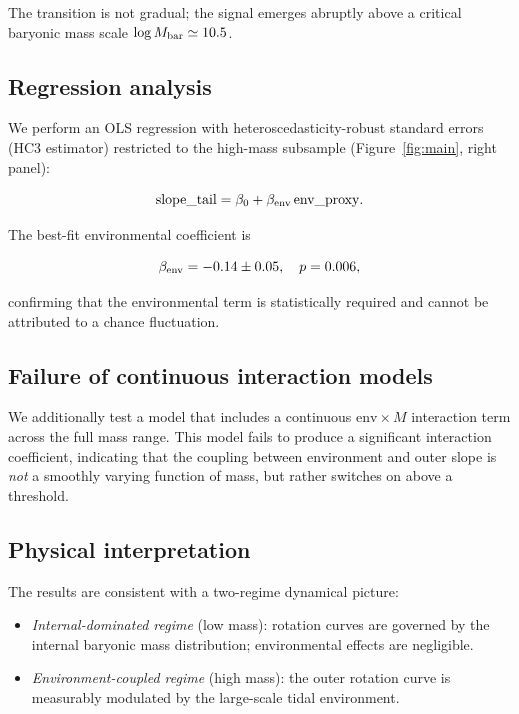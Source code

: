 The transition is not gradual; the signal emerges abruptly above a critical
baryonic mass scale $\log M_{\rm bar} \simeq 10.5$.

\subsection{Regression analysis}
\label{sec:results:regression}

We perform an OLS regression with heteroscedasticity-robust standard errors
(HC3 estimator) restricted to the high-mass subsample
(Figure~\ref{fig:main}, right panel):

\begin{equation}
  \mathrm{slope\_tail} = \beta_0 + \beta_{\rm env}\,\mathrm{env\_proxy}.
\end{equation}

The best-fit environmental coefficient is

\begin{equation}
  \beta_{\rm env} = -0.14 \pm 0.05,\quad p = 0.006,
\end{equation}

confirming that the environmental term is statistically required and cannot
be attributed to a chance fluctuation.

\subsection{Failure of continuous interaction models}
\label{sec:results:interaction}

We additionally test a model that includes a continuous $\mathrm{env} \times M$
interaction term across the full mass range.  This model fails to produce a
significant interaction coefficient, indicating that the coupling between
environment and outer slope is \emph{not} a smoothly varying function of mass,
but rather switches on above a threshold.

\subsection{Physical interpretation}
\label{sec:results:interpretation}

The results are consistent with a two-regime dynamical picture:

\begin{itemize}
  \item \emph{Internal-dominated regime} (low mass): rotation curves are
        governed by the internal baryonic mass distribution; environmental
        effects are negligible.
  \item \emph{Environment-coupled regime} (high mass): the outer rotation
        curve is measurably modulated by the large-scale tidal environment.
\end{itemize}

